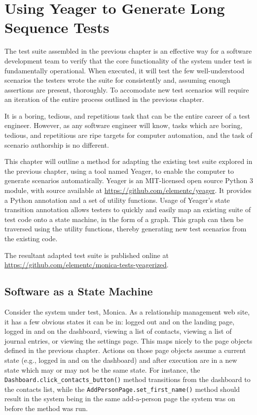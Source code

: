 \chapter{Using Yeager to Generate Long Sequence Tests}
The test suite assembled in the previous chapter is an effective way for a software development team to verify that the core functionality of the system under test is fundamentally operational. When executed, it will test the few well-understood scenarios the testers wrote the suite for consistently and, assuming enough assertions are present, thoroughly. To accomodate new test scenarios will require an iteration of the entire process outlined in the previous chapter.

It is a boring, tedious, and repetitious task that can be the entire career of a test engineer. However, as any software engineer will know, tasks which are boring, tedious, and repetitious are ripe targets for computer automation, and the task of scenario authorship is no different.

This chapter will outline a method for adapting the existing test suite explored in the previous chapter, using a tool named Yeager, to enable the computer to generate scenarios automatically. Yeager is an MIT-licensed open source Python 3 module, with source available at \url{https://github.com/elementc/yeager}. It provides a Python annotation and a set of utility functions. Usage of Yeager's state transition annotation allows testers to quickly and easily map an existing suite of test code onto a state machine, in the form of a graph. This graph can then be traversed using the utility functions, thereby generating new test scenarios from the existing code.

The resultant adapted test suite is published online at \url{https://github.com/elementc/monica-tests-yeagerized}.

\section{Software as a State Machine}
Consider the system under test, Monica. As a relationship management web site, it has a few obvious states it can be in: logged out and on the landing page, logged in and on the dashboard, viewing a list of contacts, viewing a list of journal entries, or viewing the settings page. This maps nicely to the page objects defined in the previous chapter. Actions on those page objects assume a current state (e.g., logged in and on the dashboard) and after execution are in a new state which may or may not be the same state. For instance, the \texttt{Dashboard.click\_contacts\_button()} method transitions from the dashboard to the contacts list, while the \texttt{AddPersonPage.set\_first\_name()} method should result in the system being in the same add-a-person page the system was on before the method was run.


